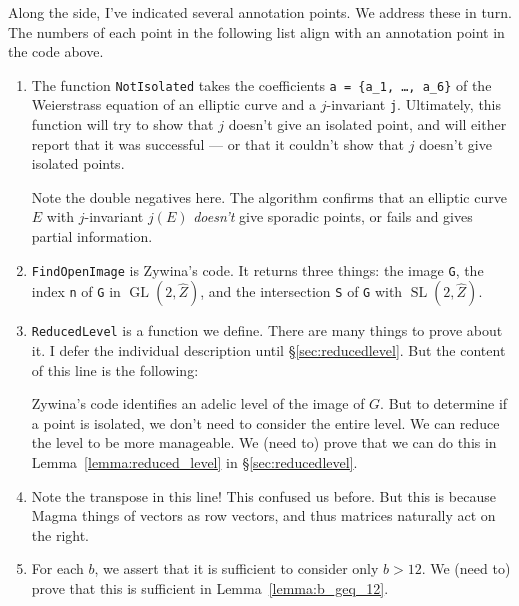 \documentclass[11pt,reqno]{amsart}
\theoremstyle{plain}
\theoremstyle{definition}
\DeclareMathOperator{\SL}{SL}
\DeclareMathOperator{\GL}{GL}
\begin{document}
Along the side, I've indicated several annotation points. We address these in
turn. The numbers of each point in the following list align with an annotation
point in the code above.

\begin{enumerate}
  \item The function \texttt{NotIsolated} takes the coefficients \texttt{a =
  \{a\_1, \ldots, a\_6\}} of the Weierstrass equation of an elliptic curve and a
  $j$-invariant \texttt{j}. Ultimately, this function will try to show that $j$
  doesn't give an isolated point, and will either report that it was successful
  --- or that it couldn't show that $j$ doesn't give isolated points.

  Note the double negatives here. The algorithm confirms that an elliptic curve
  $E$ with $j$-invariant $j(E)$ \emph{doesn't} give sporadic points, or fails
  and gives partial information.

  \item \texttt{FindOpenImage} is Zywina's code. It returns three things: the
  image \texttt{G}, the index \texttt{n} of \texttt{G} in $\GL(2, \widehat{Z})$,
  and the intersection \texttt{S} of \texttt{G} with $\SL(2, \widehat{Z})$.

  \item\label{item:reduced_level_lemma} \texttt{ReducedLevel} is a function we
  define. There are many things to prove about it. I defer the individual
  description until \S\ref{sec:reducedlevel}. But the content of this line is
  the following:

  Zywina's code identifies an adelic level of the image of $G$. But to
  determine if a point is isolated, we don't need to consider the entire level.
  We can reduce the level to be more manageable. We (need to) prove that we can
  do this in Lemma~\ref{lemma:reduced_level} in \S\ref{sec:reducedlevel}.

  \item Note the transpose in this line! This confused us before. But this is
  because Magma things of vectors as row vectors, and thus matrices naturally
  act on the right.

  \item\label{item:b_geq_12} For each $b$, we assert that it is sufficient to
  consider only $b > 12$. We (need to) prove that this is sufficient in
  Lemma~\ref{lemma:b_geq_12}.
\end{enumerate}

\end{document}
